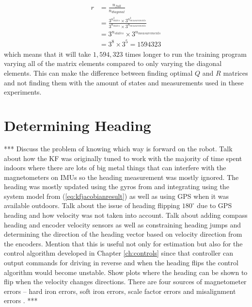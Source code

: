 \begin{align*}
\begin{split}
r &= \frac{n_{full}}{n_{diagonal}} \\
&= \frac{3^{n_{states}^2} \times 3^{n_{measurements}^2}}{3^{n_{states}} \times 3^{n_{measurements}}} \\
&= 3^{n_{states}} \times 3^{n_{measurements}} \\
&= 3^8 \times 3^5 = 1594323
\end{split}
\end{align*}
which means that it will take $1,594,323$ times longer to run the training program varying all of the matrix elements compared to only varying the diagonal elements. This can make the difference between finding optimal $Q$ and $R$ matrices and not finding them with the amount of states and measurements used in these experiments.

\section{Determining Heading}
\label{sec:determineHeading}
*** Discuss the problem of knowing which way is forward on the robot. Talk about how the KF was originally tuned to work with the majority of time spent indoors where there are lots of big metal things that can interfere with the magnetometers on IMUs so the heading measurement was mostly ignored. The heading was mostly updated using the gyros from and integrating using the system model from (\ref{eq:kfjacobianresult}) as well as using GPS when it was available outdoors. Talk about the issue of heading flipping $180^\circ$ due to GPS heading and how velocity was not taken into account. Talk about adding compass heading and encoder velocity sensors as well as constraining heading jumps and determining the direction of the heading vector based on velocity direction from the encoders. Mention that this is useful not only for estimation but also for the control algorithm developed in Chapter \ref{ch:controls} since that controller can output commands for driving in reverse and when the heading flips the control algorithm would become unstable. Show plots where the heading can be shown to flip when the velocity changes directions. There are four sources of magnetometer errors -- hard iron errors, soft iron errors, scale factor errors and misalignment errors \cite{ParkinsonHeadingEstimation01}. ***

